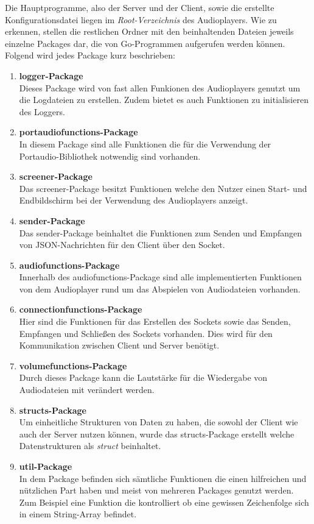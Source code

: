 Die Hauptprogramme, also der Server und der Client, sowie die erstellte
Konfigurationsdatei liegen im \textit{Root-Verzeichnis} des Audioplayers. Wie
zu erkennen, stellen die restlichen Ordner mit den beinhaltenden Dateien
jeweils einzelne Packages dar, die von Go-Programmen aufgerufen werden können. \\
Folgend wird jedes Package kurz beschrieben:  
\begin{enumerate}
\item \textbf{logger-Package} \\
Dieses Package wird von fast allen Funkionen des Audioplayers genutzt um die
Logdateien zu erstellen. Zudem bietet es auch Funktionen zu initialisieren des
Loggers.

\item \textbf{portaudiofunctions-Package} \\
In diesem Package sind alle Funktionen die für die Verwendung der
Portaudio-Bibliothek notwendig sind vorhanden. 


\item \textbf{screener-Package} \\
Das screener-Package besitzt Funktionen welche den Nutzer einen Start- und
Endbildschirm bei der Verwendung des Audioplayers anzeigt.


\item \textbf{sender-Package} \\
Das sender-Package beinhaltet die Funktionen zum Senden und Empfangen von
JSON-Nachrichten für den Client über den Socket.


\item \textbf{audiofunctions-Package} \\
Innerhalb des audiofunctions-Package sind alle implementierten Funktionen von
dem Audioplayer rund um das Abspielen von Audiodateien vorhanden.

\item \textbf{connectionfunctions-Package} \\
Hier sind die Funktionen für das Erstellen des Sockets sowie das Senden,
Empfangen und Schließen des Sockets vorhanden. Dies wird für den Kommunikation
zwischen Client und Server benötigt.

\item \textbf{volumefunctions-Package} \\
Durch dieses Package kann die Lautstärke für die Wiedergabe von Audiodateien
mit verändert werden.

\item \textbf{structs-Package} \\
Um einheitliche Strukturen von Daten zu haben, die sowohl der Client wie auch
der Server nutzen können, wurde das structs-Package erstellt welche
Datenstrukturen als \textit{struct} beinhaltet.

\item \textbf{util-Package} \\
In dem Package befinden sich sämtliche Funktionen die einen hilfreichen und
nützlichen Part haben und meist von mehreren Packages genutzt werden. Zum
Beispiel eine Funktion die kontrolliert ob eine gewissen Zeichenfolge sich in
einem String-Array befindet.
\end{enumerate}



